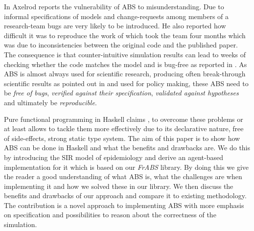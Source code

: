 In \cite{axelrod_chapter_2006} Axelrod reports the vulnerability of ABS to misunderstanding. Due to informal specifications of models and change-requests among members of a research-team bugs are very likely to be introduced. He also reported how difficult it was to reproduce the work of \cite{axelrod_convergence_1995} which took the team four months which was due to inconsistencies between the original code and the published paper. The consequence is that counter-intuitive simulation results can lead to weeks of checking whether the code matches the model and is bug-free as reported in \cite{axelrod_advancing_1997}. As ABS is almost always used for scientific research, producing often break-through scientific results as pointed out in \cite{axelrod_chapter_2006} and used for policy making, these ABS need to be \textit{free of bugs}, \textit{verified against their specification}, \textit{validated against hypotheses} and ultimately be \textit{reproducible}.

Pure functional programming in Haskell claims \cite{hudak_history_2007}, \cite{hudak_haskell_1994} to overcome these problems or at least allows to tackle them more effectively due to its declarative nature, free of side-effects, strong static type system. The aim of this paper is to show how ABS can be done in Haskell and what the benefits and drawbacks are. We do this by introducing the SIR model of epidemiology and derive an agent-based implementation for it which is based on our \textit{FrABS} library. By doing this we give the reader a good understanding of what ABS is, what the challenges are when implementing it and how we solved these in our library. We then discuss the benefits and drawbacks of our approach and compare it to existing methodology. The contribution is a novel approach to implementing ABS with more emphasis on specification and possibilities to reason about the correctness of the simulation.